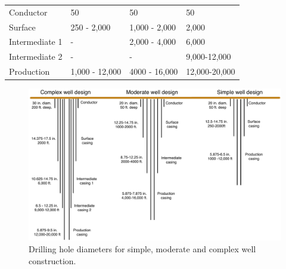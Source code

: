 \documentclass[11pt]{report}
\begin{document}
\begin{landscape}
\begin{table}
\begin{scriptsize}
\tabletail{}
\tablelasttail{\bottomrule}
\label{tab:drilling_length}
\begin{threeparttable}
\begin{supertabular*}{0.6\columnwidth}{p{0.12\columnwidth}p{0.12\columnwidth}p{0.12\columnwidth}p{0.12\columnwidth}}
Conductor 	    & 50      			& 50      			& 50      		  	\\
Surface 		&250 - 2,000		& 1,000 - 2,000 		& 2,000 		  	\\
Intermediate 1 	& -  				& 2,000 - 4,000  		& 6,000       		\\
Intermediate 2 	& -  				& -  				& 9,000-12,000  	 \\
Production 	    & 1,000 - 12,000 	& 4000 - 16,000  	& 12,000-20,000        \\
\end{supertabular*}
\end{threeparttable}
\end{scriptsize}
\end{table}

\end{landscape}


\begin{figure}[t]
\includegraphics[width=1\columnwidth]{images/all_well_hole_diam.pdf}
\caption{Drilling hole diameters for simple, moderate and complex well construction.}
\label{fig:hole_diam}
\end{figure}
\end{document}
